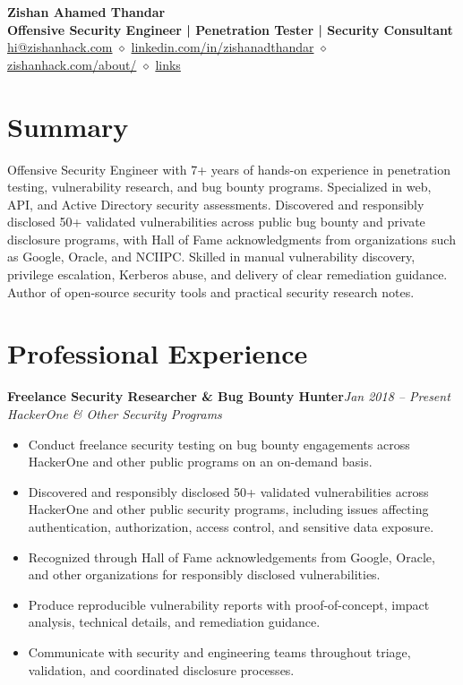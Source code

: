 \documentclass[10pt,a4paper]{article}
\newcommand{\resumeEntry}[4]{
    \textbf{#1}\hfill \textit{#2}\\
    \textit{#3}\hfill #4
    \vspace{1pt}
}
\begin{document}
\begin{center}
    {\LARGE\bfseries Zishan Ahamed Thandar}\\[3pt]
    \textbf{Offensive Security Engineer | Penetration Tester | Security Consultant}\\[4pt]
    \href{mailto:hi@zishanhack.com}{hi@zishanhack.com}
    \quad$\diamond$\quad
    \href{https://www.linkedin.com/in/zishanadthandar/}{linkedin.com/in/zishanadthandar}
    \quad$\diamond$\quad
    \href{https://zishanhack.com/about/}{zishanhack.com/about/}
    \quad$\diamond$\quad
    \href{https://zishanhack.com/links/}{links}
\end{center}

\section{Summary}

Offensive Security Engineer with 7+ years of hands-on experience in penetration testing, vulnerability research, and bug bounty programs. Specialized in web, API, and Active Directory security assessments. Discovered and responsibly disclosed 50+ validated vulnerabilities across public bug bounty and private disclosure programs, with Hall of Fame acknowledgments from organizations such as Google, Oracle, and NCIIPC. Skilled in manual vulnerability discovery, privilege escalation, Kerberos abuse, and delivery of clear remediation guidance. Author of open-source security tools and practical security research notes.

\section{Professional Experience}

\resumeEntry{Freelance Security Researcher \& Bug Bounty Hunter}{Jan 2018 -- Present}{HackerOne \& Other Security Programs}{}
\begin{itemize}
    \item Conduct freelance security testing on bug bounty engagements across HackerOne and other public programs on an on-demand basis.
    \item Discovered and responsibly disclosed 50+ validated vulnerabilities across HackerOne and other public security programs, including issues affecting authentication, authorization, access control, and sensitive data exposure.
    \item Recognized through Hall of Fame acknowledgements from Google, Oracle, and other organizations for responsibly disclosed vulnerabilities.
    \item Produce reproducible vulnerability reports with proof-of-concept, impact analysis, technical details, and remediation guidance.
    \item Communicate with security and engineering teams throughout triage, validation, and coordinated disclosure processes.
\end{itemize}
\end{document}
